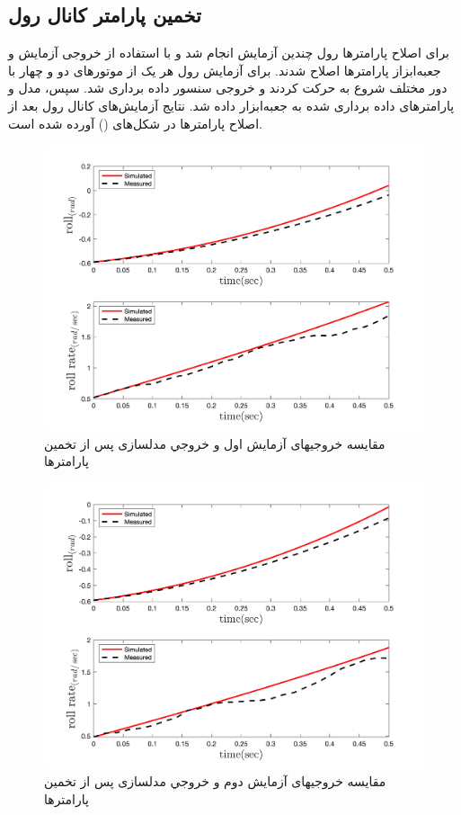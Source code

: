 \subsection{تخمین پارامتر کانال رول}
برای اصلاح پارامترها رول چندین آزمایش انجام شد و با استفاده از خروجی آزمایش و جعبه‌ابزاز
پارامترها اصلاح شدند.
برای آزمایش رول هر یک از موتورهای دو و چهار  با دور مختلف شروع به حرکت کردند و خروجی سنسور داده برداری شد. سپس، مدل و پارامترهای داده برداری شده به جعبه‌ابزار
داده شد. نتایج آزمایش‌های کانال رول بعد از اصلاح پارامترها در شکل‌های
()
آورده شده است.

\begin{figure}[H]
	\includegraphics[width=12cm]{../../Figures/RCP/roll_parameter_estimation/RCP_roll_S1.png}
	\centering
	\caption{مقايسه خروجيهای آزمايش اول و خروجي مدلسازی پس از تخمین پارامترها}
	\label{roll_ps1}
\end{figure}
\begin{figure}[H]
	\includegraphics[width=12cm]{../../Figures/RCP/roll_parameter_estimation/RCP_roll_S2.png}
	\centering
	\caption{مقايسه خروجيهای آزمايش دوم و خروجي مدلسازی پس از تخمین پارامترها}
	\label{roll_ps2}
\end{figure}
